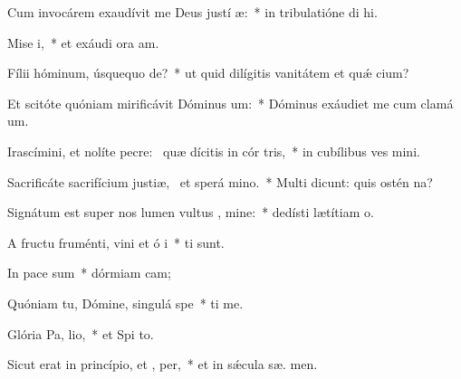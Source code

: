 \item Cum invocárem exaudívit me Deus justí æ:~* in tribulatióne di hi.
\item Mise i,~* et exáudi ora am.
\item Fílii hóminum, úsquequo  de?~* ut quid dilígitis vanitátem et quǽ cium?
\item Et scitóte quóniam mirificávit Dóminus  um:~* Dóminus exáudiet me cum clamá  um.
\item Irascímini, et nolíte pecre:~\pscross{} quæ dícitis in cór tris,~* in cubílibus ves mini.
\item Sacrificáte sacrifícium justiæ,~\pscross{} et sperá  mino.~* Multi dicunt: quis ostén  na?
\item Signátum est super nos lumen vultus , mine:~* dedísti lætítiam   o.
\item A fructu fruménti, vini et ó i~* ti sunt.
\item In pace  sum~* dórmiam  cam;
\item Quóniam tu, Dómine, singulá  spe~* ti me.
\item Glória Pa,  lio,~* et Spi to.
\item Sicut erat in princípio, et ,  per,~* et in sǽcula sæ. men.
